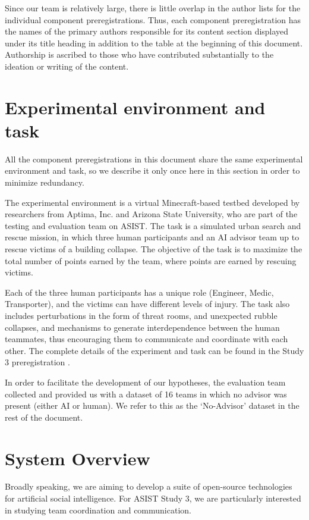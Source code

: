 Since our team is relatively large, there is little overlap in the author lists
for the individual component preregistrations. Thus, each component
preregistration has the names of the primary authors responsible for its
content section displayed under its title heading in addition to the table at
the beginning of this document. Authorship is ascribed to those who have
contributed substantially to the ideation or writing of the content.

\section{Experimental environment and task}

All the component preregistrations in this document share the same experimental
environment and task, so we describe it only once here in this section in order
to minimize redundancy.

The experimental environment is a virtual Minecraft-based testbed developed by
researchers from Aptima, Inc. and Arizona State University, who are part of the
testing and evaluation team on ASIST. 
The task is a simulated urban search and
rescue mission, in which three human participants and an AI advisor team up to
rescue victims of a building collapse. The objective of the task is to maximize
the total number of points earned by the team, where points are earned by
rescuing victims.

Each of the three human participants has a unique role
(Engineer, Medic, Transporter), and the victims can have different levels of
injury.
The task also includes perturbations in the form of threat rooms,
and unexpected rubble collapses, and mechanisms to generate interdependence
between the human teammates, thus encouraging them to communicate and
coordinate with each other.
The complete details of the experiment and task can be found in the Study 3
preregistration \cite{Huang.ea:2022}.

In order to facilitate the development of our hypotheses, the evaluation team
collected and provided us with a dataset of 16 teams in which no advisor was
present (either AI or human). We refer to this as the `No-Advisor' dataset in
the rest of the document.

\section{System Overview}
\label{ch:system}

Broadly speaking, we are aiming to develop a suite of open-source technologies
for artificial social intelligence. For ASIST Study 3, we are particularly
interested in studying team coordination and communication.

